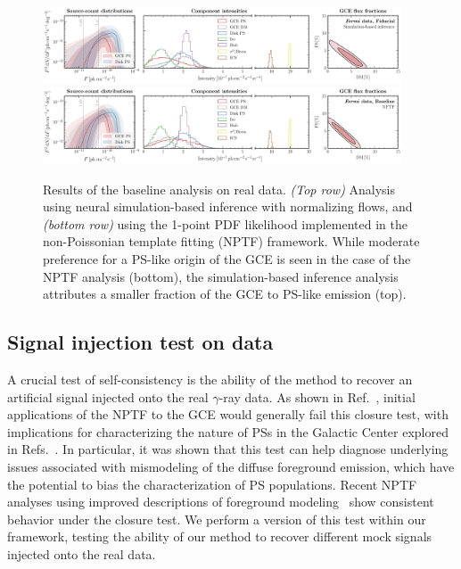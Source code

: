\documentclass[prd,aps,10pt,nofootinbib,twocolumn,superscriptaddress,preprintnumbers,balancelastpage,longbibliography]{revtex4-1}
\begin{document}
%
\begin{figure}
\centering
\includegraphics[width=0.95\textwidth]{plots/data_fid_sbi.pdf}
\includegraphics[width=0.95\textwidth]{plots/data_fid_nptf.pdf}
\caption{Results of the baseline analysis on real \Fermi data. \emph{(Top row)} Analysis using neural simulation-based inference with normalizing flows, and \emph{(bottom row)} using the 1-point PDF likelihood implemented in the non-Poissonian template fitting (NPTF) framework. While moderate preference for a PS-like origin of the GCE is seen in the case of the NPTF analysis (bottom), the simulation-based inference analysis attributes a smaller fraction of the GCE to PS-like emission (top).}
\label{fig:fid_data}
\end{figure}
%

\subsection{Signal injection test on data}
\label{sec:sig-injection}

A crucial test of self-consistency is the ability of the method to recover an artificial signal injected onto the real $\gamma$-ray data. As shown in Ref.~\cite{Leane:2019xiy}, initial applications of the NPTF to the GCE would generally fail this closure test, with implications for characterizing the nature of PSs in the Galactic Center explored in Refs.~\cite{Chang:2019ars,Buschmann:2020adf}. In particular, it was shown that this test can help diagnose underlying issues associated with mismodeling of the diffuse foreground emission, which have the potential to bias the characterization of PS populations. Recent NPTF analyses using improved descriptions of foreground modeling~\cite{Buschmann:2020adf} show consistent behavior under the closure test. We perform a version of this test within our framework, testing the ability of our method to recover different mock signals injected onto the real \Fermi data.
\end{document}
